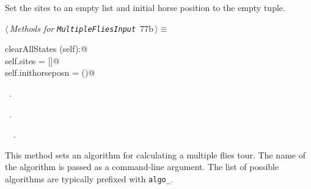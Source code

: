 \documentclass[11.5pt]{report}
\begin{document}
\vspace{-0.8cm}
\newchunk Set the sites to an empty list and initial horse position to the empty tuple.
\begin{flushleft} \small\label{scrap110}\raggedright\small
{} $\langle\,${\itshape Methods for \verb|MultipleFliesInput|}\nobreak\ {\footnotesize {77b}}$\,\rangle\equiv$
\vspace{-1ex}
\begin{list}{}{} \item
\mbox{}\verb@def clearAllStates (self):@\\
\mbox{}\verb@   self.sites = []@\\
\mbox{}\verb@   self.inithorseposn = ()@\\
\mbox{}\verb@@{\NWsep}
\end{list}
\vspace{-1.5ex}
\footnotesize
\begin{list}{}{\setlength{\itemsep}{-\parsep}\setlength{\itemindent}{-\leftmargin}}
\item \NWtxtMacroDefBy\ .
\item \NWtxtMacroRefIn\ .
\item \NWtxtIdentsDefed\nobreak\  \verb@clearAllStates@\nobreak\ .
\item{}
\end{list}
\vspace{4ex}
\end{flushleft}


\vspace{-0.8cm} \newchunk 
This method sets an algorithm for calculating
a multiple flies tour. The name of the algorithm is passed as a command-line argument.  
The list of possible algorithms are typically prefixed with \verb|algo_|. 
          
\end{document}
